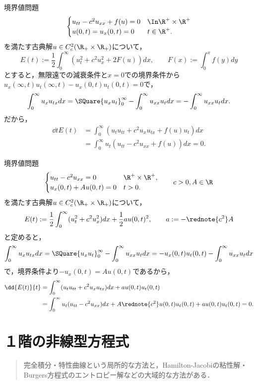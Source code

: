 \documentclass[uplatex,dvipdfmx]{jsreport}
\begin{document}
\begin{example}[外力がある場合]
    境界値問題
    \[\begin{cases}
        u_{tt}-c^2u_{xx}+f(u)=0&\In\R^+\times\R^+\\
        u(0,t)=u_x(0,t)=0&t\in\R^+.
    \end{cases}\]
    を満たす古典解$u\in C^2_c(\R_+\times\R_+)$について，
    \[E(t):=\frac{1}{2}\int^\infty_0(u_t^2+c^2u_x^2+2F(u))dx,\qquad F(x):=\int^x_0f(y)dy\]
    とすると，無限遠での減衰条件と$x=0$での境界条件から$u_x(\infty,t)u_t(\infty,t)-u_x(0,t)u_t(0,t)=0$で，
    \[\int^\infty_0u_xu_{tx}dx=\SQuare{u_xu_t}^\infty_0-\int^\infty_0u_{xx}u_tdx=-\int^\infty_0u_{xx}u_tdx.\]
    だから，
    \begin{align*}
        \dd{}{t}E(t)&=\int^\infty_0(u_tu_{tt}+c^2u_xu_{tx}+f(u)u_t)dx\\
        &=\int^\infty_0u_t(u_{tt}-c^2u_{xx}+f(u))dx=0.
    \end{align*}
\end{example}

\begin{example}[Neumann型の境界条件の場合]
    境界値問題
    \[\begin{cases}
        u_{tt}-c^2u_{xx}=0&\R^+\times\R^+,\\
        u_x(0,t)+Au(0,t)=0&t>0.
    \end{cases}\qquad c>0,A\in\R\]
    を満たす古典解$u\in C^2_c(\R_+\times\R_+)$について，
    \[E(t):=\frac{1}{2}\int^\infty_0(u_t^2+c^2u_x^2)dx+\frac{1}{2}au(0,t)^2,\qquad a:=-\rednote{c^2}A\]
    と定めると，
    \[\int^\infty_0u_xu_{tx}dx=\SQuare{u_xu_t}^\infty_0-\int^\infty_0u_{xx}u_tdx=-u_x(0,t)u_t(0,t)-\int^\infty_0u_{xx}u_tdx\]
    で，境界条件より$-u_{x}(0,t)=Au(0,t)$であるから，
    \begin{align*}
        \dd{E(t)}{t}&=\int^\infty_0(u_tu_{tt}+c^2u_xu_{tx})dx+au(0,t)u_t(0,t)\\
        &=\int^\infty_0u_t(u_{tt}-c^2u_{xx})dx+A\rednote{c^2}u(0,t)u_t(0,t)+au(0,t)u_t(0,t)=0.
    \end{align*}
\end{example}

\chapter{１階の非線型方程式}

\begin{quotation}
    完全積分・特性曲線という局所的な方法と，Hamilton-Jacobiの粘性解・Burgers方程式のエントロピー解などの大域的な方法がある．
\end{quotation}
\end{document}
